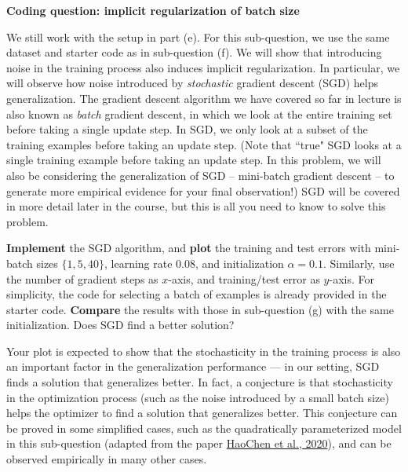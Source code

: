 \item{}\textbf{} \textbf{Coding question: implicit regularization of batch size}

We still work with the setup in part (e). For this sub-question, we use the same dataset and starter code as in sub-question (f). We will show that introducing noise in the training process also induces implicit regularization. In particular, we will observe how noise introduced by \emph{stochastic} gradient descent (SGD) helps generalization. The gradient descent algorithm we have covered so far in lecture is also known as \emph{batch} gradient descent, in which we look at the entire training set before taking a single update step. In SGD, we only look at a subset of the training examples before taking an update step. (Note that ``true" SGD looks at a single training example before taking an update step. In this problem, we will also be considering the generalization of SGD -- mini-batch gradient descent -- to generate more empirical evidence for your final observation!) SGD will be covered in more detail later in the course, but this is all you need to know to solve this problem.

\textbf{Implement} the SGD algorithm, and \textbf{plot} the training and test errors with mini-batch sizes $\{1, 5, 40\}$, learning rate $0.08$, and initialization $\alpha=0.1$. Similarly, use the number of gradient steps as $x$-axis, and training/test error as $y$-axis. For simplicity, the code for selecting a batch of examples is already provided in the starter code.
\textbf{Compare} the results with those in sub-question (g) with the same initialization. Does SGD find a better solution?

Your plot is expected to show that the stochasticity in the training process is also an important factor in the generalization performance --- in our setting, SGD finds a solution that generalizes better. In fact, a conjecture is that stochasticity in the optimization process (such as the noise introduced by a small batch size) helps the optimizer to find a solution that generalizes better. This conjecture can be proved in some simplified cases, such as the quadratically parameterized model in this sub-question (adapted from the paper \href{https://arxiv.org/abs/2006.08680}{HaoChen et al., 2020}), and can be observed empirically in many other cases.